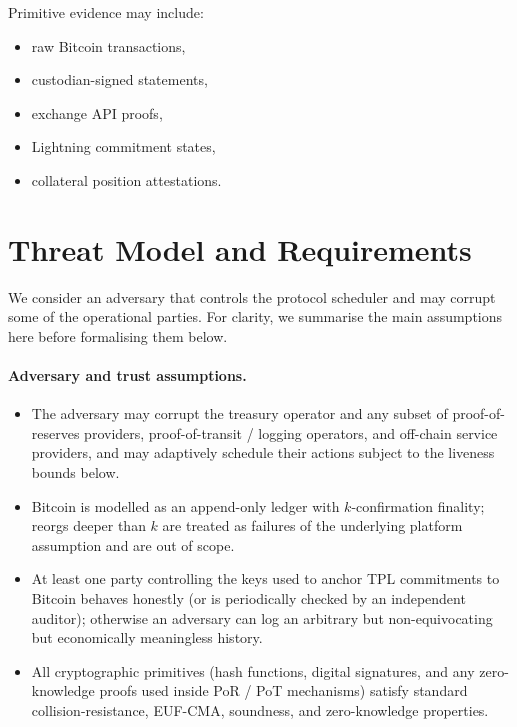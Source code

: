 \documentclass[11pt]{article}
\begin{document}
Primitive evidence may include:

\begin{itemize}[noitemsep]
\item raw Bitcoin transactions,
\item custodian-signed statements,
\item exchange API proofs,
\item Lightning commitment states,
\item collateral position attestations.
\end{itemize}

\section{Threat Model and Requirements}
\label{sec:threat}

We consider an adversary that controls the protocol scheduler and may corrupt some of the operational parties. For clarity, we summarise the main assumptions here before formalising them below.

\paragraph{Adversary and trust assumptions.}
\begin{itemize}[noitemsep]
\item The adversary may corrupt the treasury operator and any subset of proof-of-reserves providers, proof-of-transit / logging operators, and off-chain service providers, and may adaptively schedule their actions subject to the liveness bounds below.
\item Bitcoin is modelled as an append-only ledger with $k$-confirmation finality; reorgs deeper than $k$ are treated as failures of the underlying platform assumption and are out of scope.
\item At least one party controlling the keys used to anchor TPL commitments to Bitcoin behaves honestly (or is periodically checked by an independent auditor); otherwise an adversary can log an arbitrary but non-equivocating but economically meaningless history.
\item All cryptographic primitives (hash functions, digital signatures, and any zero-knowledge proofs used inside PoR / PoT mechanisms) satisfy standard collision-resistance, EUF-CMA, soundness, and zero-knowledge properties.
\end{itemize}
\end{document}
